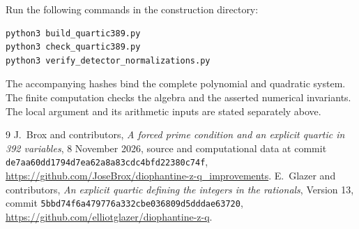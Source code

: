\documentclass[11pt,a4paper]{article}
\theoremstyle{remark}\newtheorem{remark}[theorem]{Remark}
\begin{document}
Run the following commands in the construction directory:
\begin{verbatim}
python3 build_quartic389.py
python3 check_quartic389.py
python3 verify_detector_normalizations.py
\end{verbatim}
The accompanying hashes bind the complete polynomial and quadratic
system. The finite computation checks the algebra and the asserted
numerical invariants. The local argument and its arithmetic inputs
are stated separately above.

\begin{thebibliography}{9}
J.~Brox and contributors, \emph{A forced prime condition and an explicit
quartic in 392 variables}, 8 November 2026, source and computational data
at commit \nolinkurl{de7aa60dd1794d7ea62a8a83cdc4bfd22380c74f},
\url{https://github.com/JoseBrox/diophantine-z-q_improvements}.
E.~Glazer and contributors, \emph{An explicit quartic defining the
integers in the rationals}, Version 13, commit
\nolinkurl{5bbd74f6a479776a332cbe036809d5dddae63720},
\url{https://github.com/elliotglazer/diophantine-z-q}.
\end{thebibliography}
\end{document}
